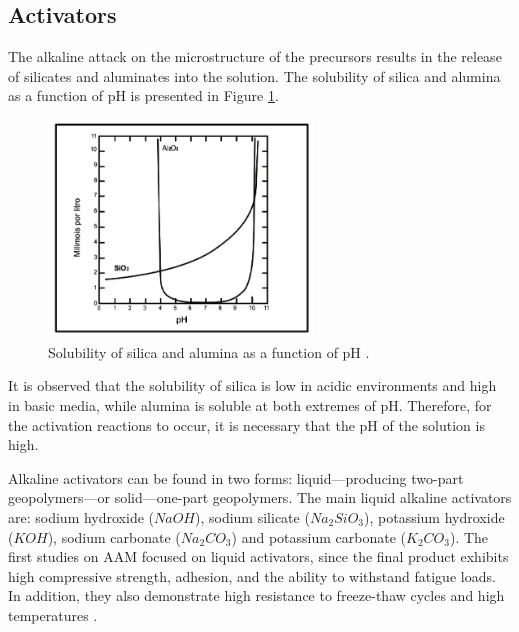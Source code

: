 

\subsection{Activators}

The alkaline attack on the microstructure of the precursors results in the release of silicates and aluminates into the solution.
The solubility of silica and alumina as a function of pH is presented in Figure \ref{fig:solubility}.

\begin{figure}[ht]
  \centering
  \includegraphics[width=0.625\textwidth]{Cap2/images/solubility.png}
  \caption{Solubility of silica and alumina as a function of pH \cite{mason1952principles}.}
  \label{fig:solubility}
\end{figure}

It is observed that the solubility of silica is low in acidic environments and high in basic media, while alumina is soluble at both extremes of pH.
Therefore, for the activation reactions to occur, it is necessary that the pH of the solution is high.

Alkaline activators can be found in two forms: liquid—producing two-part geopolymers—or solid—one-part geopolymers.
The main liquid alkaline activators are: sodium hydroxide ($NaOH$), sodium silicate ($Na_2SiO_3$), potassium hydroxide ($KOH$), sodium carbonate ($Na_2CO_3$) and potassium carbonate ($K_2CO_3$).
The first studies on AAM focused on liquid activators, since the final product exhibits high compressive strength, adhesion, and the ability to withstand fatigue loads. In addition, they also demonstrate high resistance to freeze-thaw cycles and high temperatures \cite{heath2014gwp}.

